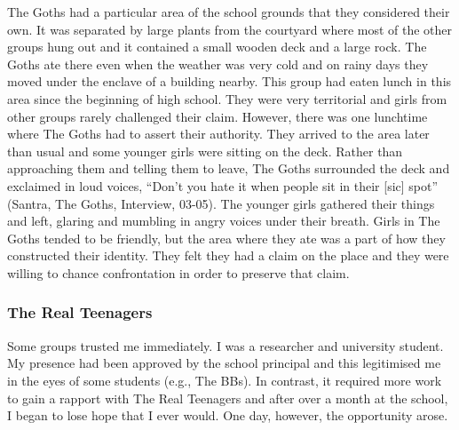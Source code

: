 The Goths had a particular area of the school grounds that they considered their own. It was separated by large plants from the courtyard where most of the other groups hung out and it contained a small wooden deck and a large rock. The Goths ate there even when the weather was very cold and on rainy days they moved under the enclave of a building nearby. This group had eaten lunch in this area since the beginning of high school. They were very territorial and girls from other groups rarely challenged their claim. However, there was one lunchtime where The Goths had to assert their authority. They arrived to the area later than usual and some younger girls were sitting on the deck. Rather than approaching them and telling them to leave, The Goths surrounded the deck and exclaimed in loud voices, ``Don't you hate it when people sit in their [sic] spot'' (Santra, The Goths, Interview, 03-05). The younger girls gathered their things and left, glaring and mumbling in angry voices under their breath. Girls in The Goths tended to be friendly, but the area where they ate was a part of how they constructed their identity. They felt they had a claim on the place and they were willing to chance confrontation in order to preserve that claim.


\subsubsection{The Real Teenagers}

Some groups trusted me immediately. I was a researcher and university student. My presence had been approved by the school principal and this legitimised me in the eyes of some students (e.g., The BBs). In contrast, it required more work to gain a rapport with The Real Teenagers and after over a month at the school, I began to lose hope that I ever would. One day, however, the opportunity arose.

